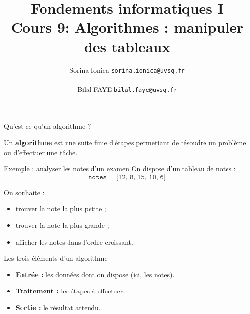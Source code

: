 \documentclass[10pt]{beamer}
\title[IN100 Cours 9]{\textbf{Fondements informatiques I}\\
Cours 9: Algorithmes : manipuler des tableaux}
\author[]{Sorina Ionica \texttt{sorina.ionica@uvsq.fr} \\~\\Bilal FAYE  \texttt{bilal.faye@uvsq.fr} }
\institute{}
\date{}
\begin{document}
\frame{\titlepage}
\begin{frame}{Qu'est-ce qu'un algorithme ?}

Un \textbf{algorithme} est une suite finie d'étapes permettant de
résoudre un problème ou d'effectuer une tâche.

\begin{exampleblock}{Exemple : analyser les notes d'un examen}
On dispose d'un tableau de notes :
\[
\texttt{notes = [12, 8, 15, 10, 6]}
\]

On souhaite :
\begin{itemize}
    \item trouver la note la plus petite ;
    \item trouver la note la plus grande ;
    \item afficher les notes dans l'ordre croissant.
\end{itemize}
\end{exampleblock}

\pause

\begin{block}{Les trois éléments d'un algorithme}
\begin{itemize}
    \item \textbf{Entrée :} les données dont on dispose (ici, les notes).
    \item \textbf{Traitement :} les étapes à effectuer.
    \item \textbf{Sortie :} le résultat attendu.
\end{itemize}
\end{block}

\end{frame}
\end{document}
